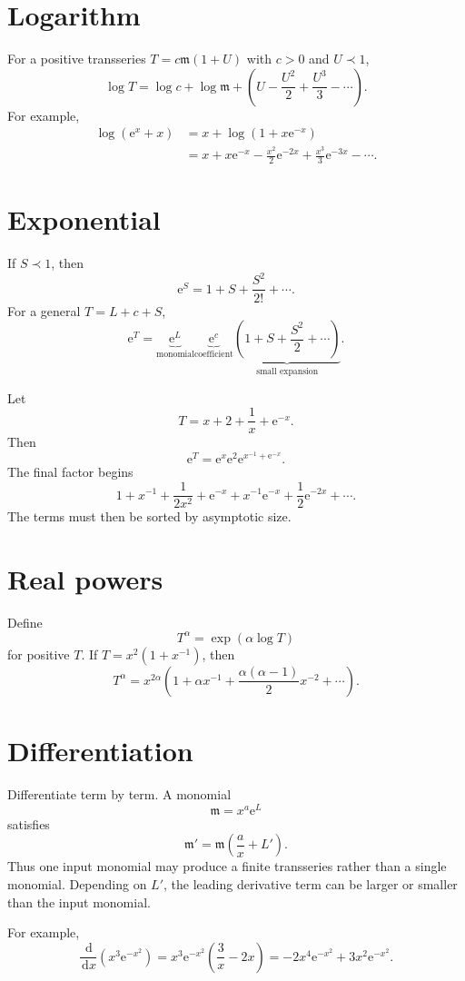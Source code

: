 \documentclass[11pt,oneside,openany]{book}
\newcommand{\e}{\mathrm{e}}
\newcommand{\dd}{\,\mathrm{d}}
\newcommand{\mon}{\mathfrak{m}}
\theoremstyle{plain}
\theoremstyle{definition}
\theoremstyle{remark}
\begin{document}
\section{Logarithm}
For a positive transseries $T=c\mon(1+U)$ with $c>0$ and $U\prec1$,
\[
  \log T=\log c+\log\mon+
  \left(U-\frac{U^2}{2}+\frac{U^3}{3}-\cdots\right).
\]
For example,
\[
\begin{aligned}
  \log(\e^x+x)
  &=x+\log(1+x\e^{-x})\\
  &=x+x\e^{-x}-\frac{x^2}{2}\e^{-2x}
    +\frac{x^3}{3}\e^{-3x}-\cdots.
\end{aligned}
\]

\section{Exponential}
If $S\prec1$, then
\[
  \e^S=1+S+\frac{S^2}{2!}+\cdots.
\]
For a general $T=L+c+S$,
\[
  \e^T=\underbrace{\e^L}_{\text{monomial}}
  \underbrace{\e^c}_{\text{coefficient}}
  \underbrace{\left(1+S+\frac{S^2}{2}+\cdots\right)}_{\text{small expansion}}.
\]

\begin{worked}
Let
\[
  T=x+2+\frac1x+\e^{-x}.
\]
Then
\[
  \e^T=\e^x\e^2\e^{x^{-1}+\e^{-x}}.
\]
The final factor begins
\[
  1+x^{-1}+\frac1{2x^2}+\e^{-x}
  +x^{-1}\e^{-x}+\frac12\e^{-2x}+\cdots.
\]
The terms must then be sorted by asymptotic size.
\end{worked}

\section{Real powers}
Define
\[
  T^\alpha=\exp(\alpha\log T)
\]
for positive $T$. If $T=x^2(1+x^{-1})$, then
\[
  T^\alpha=x^{2\alpha}
  \left(1+\alpha x^{-1}
  +\frac{\alpha(\alpha-1)}{2}x^{-2}+\cdots\right).
\]

\section{Differentiation}
Differentiate term by term. A monomial
\[
  \mon=x^a\e^{L}
\]
satisfies
\[
  \mon'=\mon\left(\frac ax+L'\right).
\]
Thus one input monomial may produce a finite transseries rather than a single monomial. Depending on $L'$, the leading derivative term can be larger or smaller than the input monomial.

For example,
\[
  \frac{\dd}{\dd x}\left(x^3\e^{-x^2}\right)
  =x^3\e^{-x^2}\left(\frac3x-2x\right)
  =-2x^4\e^{-x^2}+3x^2\e^{-x^2}.
\]
\end{document}
